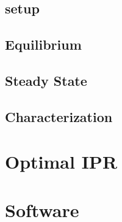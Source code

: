 \documentclass{beamer}
\begin{document}
\subsection{setup}
\label{sub:setup}

\subsection{Equilibrium}
\label{sub:equilibrium}

\subsection{Steady State}
\label{sub:steady_state}

\subsection{Characterization}
\label{sub:characterization}

\section{Optimal IPR}
\label{sec:optimal_ipr}


\section{Software}
\label{sec:software}
\end{document}
